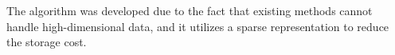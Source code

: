 The algorithm was developed due to the fact that existing methods cannot handle high-dimensional data, and it utilizes a sparse representation to reduce the storage cost.

